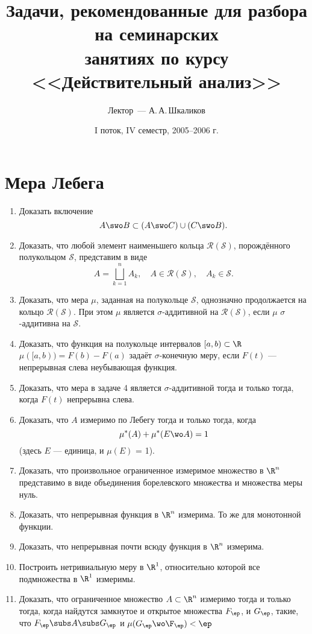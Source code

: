 \documentclass[a4paper]{article}
\title{Задачи, рекомендованные для разбора на семинарских\\
занятиях по курсу <<Действительный анализ>>}
\author{Лектор~--- А.\,А.\,Шкаликов}
\date{I поток, IV семестр, 2005--2006 г.}
\begin{document}
\maketitle

\dmvntrail

\section{Мера Лебега}

\begin{enumerate}
\setlength{\itemsep}{-3pt}
\item
Доказать включение
$$
A\swo B\subset (A\swo C)\cup (C\swo B).
$$
\item
Доказать, что любой элемент наименьшего кольца
$\mathcal{R}(\mathcal{S})$, порождённого полукольцом
$\mathcal{S}$, представим в виде
$$
A=\bigsqcup\limits_{k=1}^n A_k,\quad A\in
\mathcal{R}(\mathcal{S}),\quad A_k\in \mathcal{S}.
$$
\item
Доказать, что мера $\mu$, заданная на полукольце $\mathcal{S}$,
однозначно продолжается на кольцо $\mathcal{R}(\mathcal{S})$. При
этом $\mu$ является $\sigma$-аддитивной на
$\mathcal{R}(\mathcal{S})$, если $\mu$ $\sigma$-аддитивна на
$\mathcal{S}$.
\item
Доказать, что функция на полукольце интервалов $[a, b)\subset \R$
$\mu ([a, b))=F(b)-F(a)$ задаёт $\sigma$-конечную меру, если
$F(t)$ --- непрерывная слева неубывающая функция.
\item
Доказать, что мера в задаче 4 является $\sigma$-аддитивной тогда и
только тогда, когда $F(t)$ непрерывна слева.
\item
Доказать, что $A$ измеримо по Лебегу тогда и только тогда, когда
$$
\mu^*(A)+\mu^*(E\wo A)=1
$$
(здесь $E$ --- единица, и $\mu(E)$ = 1).
\item
Доказать, что произвольное ограниченное измеримое множество в
$\R^n$ представимо в виде объединения борелевского множества и
множества меры нуль.
\item
Доказать, что непрерывная функция в $\R^n$ измерима. То же для
монотонной функции.
\item
Доказать, что непрерывная почти всюду функция в $\R^n$ измерима.
\item
Построить нетривиальную меру в $\R^1$, относительно которой все
подмножества в $\R^1$ измеримы.
\item
Доказать, что ограниченное множество $A\subset \R^n$ измеримо
тогда и только тогда, когда найдутся замкнутое и открытое
множества $F_\ep$, и $G_\ep$, такие, что $F_\ep\subs A\subs G_\ep$
и $\mu (G_\ep\wo\F_\ep)<\ep$

\end{enumerate}
\end{document}

